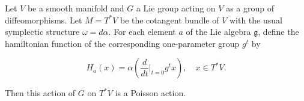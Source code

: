 Let $V$ be a smooth manifold and $G$ a Lie group acting on $V$ as a group of diffeomorphisms. Let $M = T^*V$ be the cotangent bundle of $V$ with the usual symplectic structure $\omega = d\alpha$. For each element $a$ of the Lie algebra $\mathfrak{g}$, define the hamiltonian function of the corresponding one-parameter group $g^t$ by

$$H_a(x) = \alpha\left( \frac{d}{dt} \bigg|_{t=0} g^t x \right), \quad x \in T^*V.$$

Then this action of $G$ on $T^*V$ is a Poisson action.
